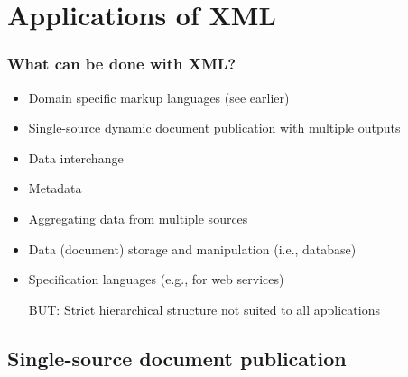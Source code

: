 

\section{Applications of XML}




\frame
{
	\frametitle{What can be done with XML?}
	
	\begin{itemize}
	
		\item Domain specific markup languages (see earlier)

		\item Single-source dynamic document publication with multiple
		outputs
		

		\item Data interchange
		
		
		\item Metadata

		\item Aggregating data from multiple sources

		\item Data (document) storage and manipulation (i.e., database)
		
		\item Specification languages (e.g., for web services)
		
		\item[\alert{BUT:}] Strict hierarchical structure not suited to
		all applications

	\end{itemize}
}





\subsection*{Single-source document publication}




